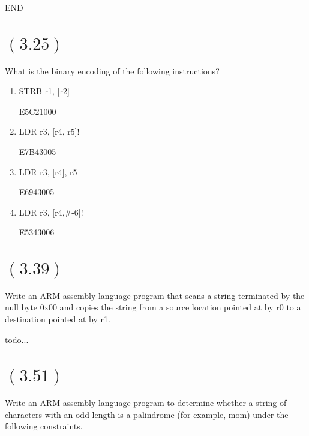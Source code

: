 \documentclass[letterpaper,12pt,titlepage]{article}
\begin{document}
    END

\section*{$(3.25)$} What is the binary encoding of the following instructions?

\renewcommand{\labelenumi}{\alph{enumi})}
\begin{enumerate}

\item STRB r1, [r2]

\begin{mdframed}[style=MyFrame]
E5C21000 
\end{mdframed}

\item LDR r3, [r4, r5]!

\begin{mdframed}[style=MyFrame]
E7B43005 
\end{mdframed}

\item LDR r3, [r4], r5

\begin{mdframed}[style=MyFrame]
E6943005 
\end{mdframed}

\item LDR r3, [r4,\#-6]! 

\begin{mdframed}[style=MyFrame]
E5343006 
\end{mdframed}

\end{enumerate}

\section*{$(3.39)$} Write an ARM assembly language program that scans a string terminated by the null byte 0x00 and copies the string from a source location pointed at by r0 to a destination pointed at by r1.

\begin{mdframed}[style=MyFrame]
todo...
\end{mdframed}

\section*{$(3.51)$} Write an ARM assembly language program to determine whether a string of characters with an odd length is a palindrome (for example, mom) under the following constraints.
\end{document}
